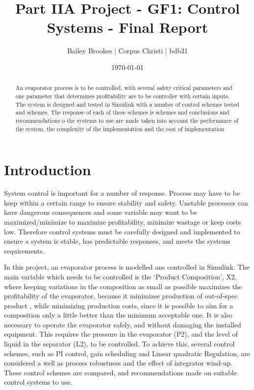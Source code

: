 \documentclass[11pt]{article}
\title{Part IIA Project - GF1: Control Systems - Final Report}
\author{Bailey Brookes | Corpus Christi | bdb31}
\date{\today}
\begin{document}
\maketitle

\begin{abstract}
An evaporator process is to be controlled, with several safety critical parameters and one parameter that determines profitability are to be controller with certain inputs. The system is designed and tested in Simulink with a number of control schemes tested and schemes. The response of each of these schemes is schemes and conclusions and recommendations o the systems to use are made taken into account the performance of the system, the complexity of the implementation  and the cost of implementation 

\end{abstract}

\tableofcontents 

\section{Introduction}
System control is important for a number of response. Process may have to be keep within a certain range to ensure stability and safety. Unstable processes can have dangerous consequences and some variable may want to be maximized/minimize to maximize profitability, minimize wastage or keep costs low. Therefore control systems must be carefully designed and implemented to ensure a system is stable, has predictable responses, and meets the systems requirements.

In this project, an evaporator process is modelled ans controlled in Simulink. The main variable which needs to be controlled is the ‘Product Composition’,  X2, where keeping variations in the composition as small as possible maximizes the profitability of the evaporator, because it minimizes production of out-of-spec product , while minimizing production costs, since it is possible to aim for a composition only a little better than the minimum acceptable one. It is also necessary to operate the evaporator safely, and without damaging the installed equipment. This requires the pressure in the evaporator (P2), and the level of liquid in the separator (L2), to be controlled. To achieve this, several control schemes, such as PI control, gain scheduling and Linear quadratic Regulation, are considered a well as process robustness and the effect of integrator wind-up. These control schemes are compared, and recommendations made on suitable control systems to use. 
\end{document}
